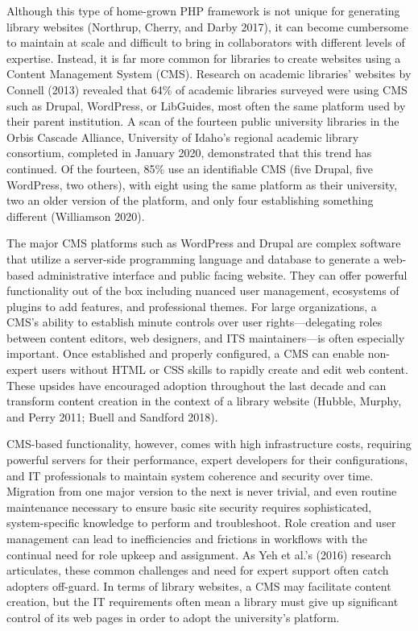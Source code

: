 \documentclass{book}
\begin{document}
Although this type of home-grown PHP framework is not unique for generating
library websites (Northrup, Cherry, and Darby 2017), it can become cumbersome
to maintain at scale and difficult to bring in collaborators with different
levels of expertise. Instead, it is far more common for libraries to create
websites using a Content Management System (CMS). Research on academic
libraries' websites by Connell (2013) revealed that 64\% of academic libraries
surveyed were using CMS such as Drupal, WordPress, or LibGuides, most often
the same platform used by their parent institution. A scan of the fourteen
public university libraries in the Orbis Cascade Alliance, University of
Idaho's regional academic library consortium, completed in January 2020,
demonstrated that this trend has continued. Of the fourteen, 85\% use an
identifiable CMS (five Drupal, five WordPress, two others), with eight using
the same platform as their university, two an older version of the platform,
and only four establishing something different (Williamson 2020).

The major CMS platforms such as WordPress and Drupal are complex software that
utilize a server-side programming language and database to generate a
web-based administrative interface and public facing website. They can offer
powerful functionality out of the box including nuanced user management,
ecosystems of plugins to add features, and professional themes. For large
organizations, a CMS's ability to establish minute controls over user
rights---delegating roles between content editors, web designers, and ITS
maintainers---is often especially important. Once established and properly
configured, a CMS can enable non-expert users without HTML or CSS skills to
rapidly create and edit web content. These upsides have encouraged adoption
throughout the last decade and can transform content creation in the context
of a library website (Hubble, Murphy, and Perry 2011; Buell and Sandford
2018).

CMS-based functionality, however, comes with high infrastructure costs,
requiring powerful servers for their performance, expert developers for their
configurations, and IT professionals to maintain system coherence and security
over time. Migration from one major version to the next is never trivial, and
even routine maintenance necessary to ensure basic site security requires
sophisticated, system-specific knowledge to perform and troubleshoot. Role
creation and user management can lead to inefficiencies and frictions in
workflows with the continual need for role upkeep and assignment. As Yeh et
al.'s (2016) research articulates, these common challenges and need for expert
support often catch adopters off-guard. In terms of library websites, a CMS
may facilitate content creation, but the IT requirements often mean a library
must give up significant control of its web pages in order to adopt the
university's platform.
\end{document}
